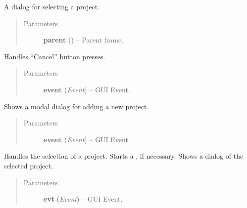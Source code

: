 \documentclass[letterpaper,10pt,english]{sphinxmanual}
\begin{document}
\begin{fulllineitems}
\label{dialogs:dialogs.ProjectSelectDialog}
A dialog for selecting a project.
\begin{quote}\begin{description}
\item[{Parameters}] \leavevmode
\textbf{parent} () -- Parent frame.

\end{description}\end{quote}

\begin{fulllineitems}
\label{dialogs:dialogs.ProjectSelectDialog.OnCancel}
Handles ``Cancel'' button presses.
\begin{quote}\begin{description}
\item[{Parameters}] \leavevmode
\textbf{event} (\emph{Event}) -- GUI Event.

\end{description}\end{quote}

\end{fulllineitems}


\begin{fulllineitems}
\label{dialogs:dialogs.ProjectSelectDialog.OnProjectAdd}
Shows a modal dialog for adding a new project.
\begin{quote}\begin{description}
\item[{Parameters}] \leavevmode
\textbf{event} (\emph{Event}) -- GUI Event.

\end{description}\end{quote}

\end{fulllineitems}


\begin{fulllineitems}
\label{dialogs:dialogs.ProjectSelectDialog.OnProjectDelete}
Handles the selection of a project.
Starts a , if necessary.
Shows a dialog of the selected project.
\begin{quote}\begin{description}
\item[{Parameters}] \leavevmode
\textbf{evt} (\emph{Event}) -- GUI Event.


\end{description}
\end{quote}
\end{fulllineitems}
\end{fulllineitems}
\end{document}
